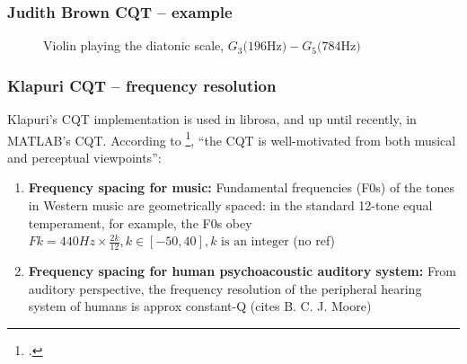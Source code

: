 \documentclass[usenames,dvipsnames]{beamer}
\begin{document}
\begin{frame}
	\frametitle{Judith Brown CQT -- example}
	\begin{figure}[ht]
		\centering
		\hspace{0.5em}
		\caption{Violin playing the diatonic scale, $G_{3} \text{(196Hz)} - G_{5} \text{(784Hz)}$}
\end{figure}

\end{frame}

\begin{frame}
	\frametitle{Klapuri CQT -- frequency resolution}
	Klapuri's CQT implementation is used in librosa, and up until recently, in MATLAB's CQT. According to \footcite{cqtklapuri}, ``the CQT is well-motivated from both musical and perceptual viewpoints'':
	\begin{enumerate}
		\item
			\textbf{Frequency spacing for music:} Fundamental frequencies (F0s) of the tones in Western music are geometrically spaced: in the standard 12-tone equal temperament, for example, the F0s obey $Fk= 440Hz \times \frac{2k}{12}, k \in [−50, 40], k \text{ is an integer}$ (no ref)
		 \item
			 \textbf{Frequency spacing for human psychoacoustic auditory system:} From auditory perspective, the frequency resolution of the peripheral hearing system of humans is approx constant-Q (cites B. C. J. Moore)
	\end{enumerate}
\end{frame}
\end{document}
